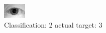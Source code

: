 \begin{figure}[h!]
\begin{center}
\includegraphics[width=0.60\columnwidth]{figures/ID1140_class_2_target_3.png}
\end{center}
\caption{ Classification: 2 actual target: 3}
\label{fig:ID1140_class_2_target_3}
\end{figure}
